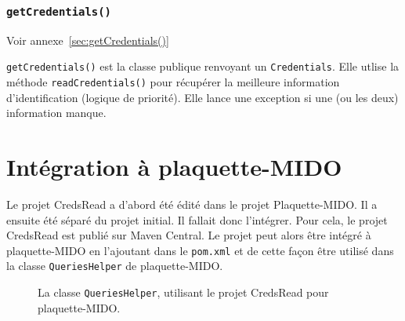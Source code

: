 \subsubsection{\texttt{getCredentials()}}
Voir annexe~\ref{sec:getCredentials()}

\texttt{getCredentials()} est la classe publique renvoyant un \texttt{Credentials}. Elle utlise la méthode \texttt{readCredentials()} pour récupérer la meilleure information d'identification (logique de priorité). Elle lance une exception si une (ou les deux) information manque.

\section{Intégration à plaquette-MIDO}

Le projet CredsRead a d'abord été édité dans le projet Plaquette-MIDO. Il a ensuite été séparé du projet initial. Il fallait donc l'intégrer. Pour cela, le projet CredsRead est publié sur Maven Central. Le projet peut alors être intégré à plaquette-MIDO en l'ajoutant dans le \texttt{pom.xml} et de cette façon être utilisé dans la classe \texttt{QueriesHelper} de plaquette-MIDO.

\begin{figure}[!ht]
    
    \caption*{La classe \texttt{QueriesHelper}, utilisant le projet CredsRead pour plaquette-MIDO.}
\end{figure}